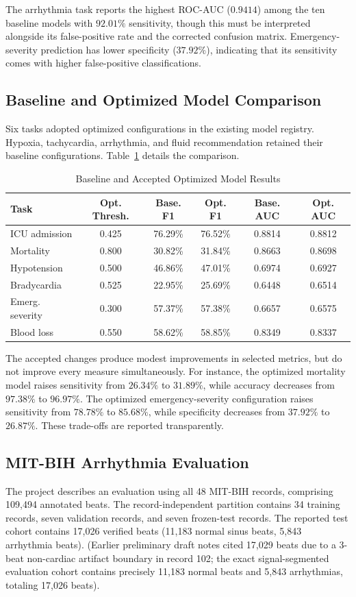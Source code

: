\documentclass[conference]{IEEEtran}
\begin{document}
The arrhythmia task reports the highest ROC-AUC ($0.9414$) among the ten baseline models with $92.01\%$ sensitivity, though this must be interpreted alongside its false-positive rate and the corrected confusion matrix. Emergency-severity prediction has lower specificity ($37.92\%$), indicating that its sensitivity comes with higher false-positive classifications.

\subsection{Baseline and Optimized Model Comparison}
Six tasks adopted optimized configurations in the existing model registry. Hypoxia, tachycardia, arrhythmia, and fluid recommendation retained their baseline configurations. Table~\ref{tab:opt_comp} details the comparison.

\begin{table}[htbp]
\centering
\caption{Baseline and Accepted Optimized Model Results}
\label{tab:opt_comp}
\begin{tabularx}{\columnwidth}{l c c c c c}
\toprule
\textbf{Task} & \textbf{Opt. Thresh.} & \textbf{Base. F1} & \textbf{Opt. F1} & \textbf{Base. AUC} & \textbf{Opt. AUC} \\
\midrule
ICU admission & 0.425 & 76.29\% & 76.52\% & 0.8814 & 0.8812 \\
Mortality & 0.800 & 30.82\% & 31.84\% & 0.8663 & 0.8698 \\
Hypotension & 0.500 & 46.86\% & 47.01\% & 0.6974 & 0.6927 \\
Bradycardia & 0.525 & 22.95\% & 25.69\% & 0.6448 & 0.6514 \\
Emerg. severity & 0.300 & 57.37\% & 57.38\% & 0.6657 & 0.6575 \\
Blood loss & 0.550 & 58.62\% & 58.85\% & 0.8349 & 0.8337 \\
\bottomrule
\end{tabularx}
\end{table}

The accepted changes produce modest improvements in selected metrics, but do not improve every measure simultaneously. For instance, the optimized mortality model raises sensitivity from $26.34\%$ to $31.89\%$, while accuracy decreases from $97.38\%$ to $96.97\%$. The optimized emergency-severity configuration raises sensitivity from $78.78\%$ to $85.68\%$, while specificity decreases from $37.92\%$ to $26.87\%$. These trade-offs are reported transparently.

\subsection{MIT-BIH Arrhythmia Evaluation}
The project describes an evaluation using all 48 MIT-BIH records, comprising 109,494 annotated beats. The record-independent partition contains 34 training records, seven validation records, and seven frozen-test records. The reported test cohort contains 17,026 verified beats (11,183 normal sinus beats, 5,843 arrhythmia beats). (Earlier preliminary draft notes cited 17,029 beats due to a 3-beat non-cardiac artifact boundary in record 102; the exact signal-segmented evaluation cohort contains precisely 11,183 normal beats and 5,843 arrhythmias, totaling 17,026 beats).
\end{document}
